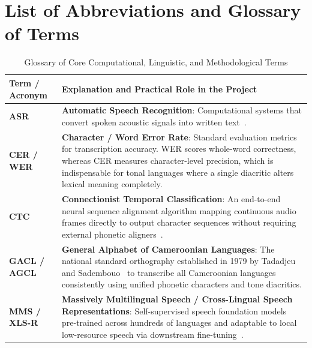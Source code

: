 \documentclass[a4paper,11pt]{article}
\author{IUSJ Engineering Group}
\begin{document}
\mytitle

\newpage

\frontmatter

\tableofcontents

\newpage

\section*{List of Abbreviations and Glossary of Terms}

\begin{table}[h!]
\centering
\small
\caption{Glossary of Core Computational, Linguistic, and Methodological Terms}
\label{tab:glossary_chap2}
\begin{tabular}{>{\raggedright\arraybackslash}p{3.2cm} >{\raggedright\arraybackslash}p{14.3cm}}
\toprule
\textbf{Term / Acronym} & \textbf{Explanation and Practical Role in the Project} \\
\midrule
\textbf{ASR} & \textbf{Automatic Speech Recognition}: Computational systems that convert spoken acoustic signals into written text~\cite{amodei2016deep, radford2023robust}. \\
\addlinespace
\textbf{CER / WER} & \textbf{Character / Word Error Rate}: Standard evaluation metrics for transcription accuracy. WER scores whole-word correctness, whereas CER measures character-level precision, which is indispensable for tonal languages where a single diacritic alters lexical meaning completely. \\
\addlinespace
\textbf{CTC} & \textbf{Connectionist Temporal Classification}: An end-to-end neural sequence alignment algorithm mapping continuous audio frames directly to output character sequences without requiring external phonetic aligners~\cite{graves2006connectionist, kurzinger2020ctc}. \\
\addlinespace
\textbf{GACL / AGCL} & \textbf{General Alphabet of Cameroonian Languages}: The national standard orthography established in 1979 by Tadadjeu and Sadembouo~\cite{tadadjeu1979alphabet} to transcribe all Cameroonian languages consistently using unified phonetic characters and tone diacritics. \\
\addlinespace
\textbf{MMS / XLS-R} & \textbf{Massively Multilingual Speech / Cross-Lingual Speech Representations}: Self-supervised speech foundation models pre-trained across hundreds of languages and adaptable to local low-resource speech via downstream fine-tuning~\cite{babu2022xlsr, pratap2024scaling}. \\

\end{tabular}
\end{table}
\end{document}
